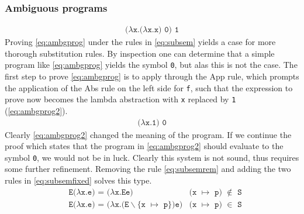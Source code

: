 \subsubsection{Ambiguous programs}
\begin{align}
	\texttt{($\lambda$x.($\lambda$x.x) 0) 1} \label{eq:ambgprog}
\end{align}
Proving \autoref{eq:ambgprog} under the rules in \autoref{eq:subsem} yields a case for more thorough substitution rules.
By inspection one can determine that a simple program like \autoref{eq:ambgprog} yields the symbol \texttt{0}, but alas this is not the case.
The first step to prove \autoref{eq:ambgprog} is to apply through the App rule, which prompts the application of the Abs rule on the left side for \texttt{f}, such that the expression to prove now becomes the lambda abstraction with \texttt{x} replaced by \texttt{1} (\autoref{eq:ambgprog2}).
\begin{align}
	\texttt{($\lambda$x.1) 0} \label{eq:ambgprog2}
\end{align}
Clearly \autoref{eq:ambgprog2} changed the meaning of the program.
If we continue the proof which states that the program in \autoref{eq:ambgprog2} should evaluate to the symbol \texttt{0}, we would not be in luck.
Clearly this system is not sound, thus requires some further refinement.
Removing the rule \autoref{eq:subsemrem} and adding the two rules in \autoref{eq:subsemfixed} solves this type.
\begin{align}
	 & \texttt{E($\lambda$x.e) = ($\lambda$x.Ee)}                                & \texttt{(x $\mapsto$ p) $\notin$ S} \label{eq:subsemfixed} \\
	 & \texttt{E($\lambda$x.e) = ($\lambda$x.(E$\backslash$\{x $\mapsto$ p\})e)} & \texttt{(x $\mapsto$ p) $\in$ S} \tag*{}
\end{align}
